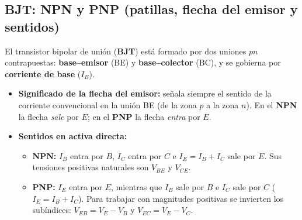 \documentclass[11pt,a4paper]{article}
\begin{document}
	\subsection{BJT: NPN y PNP (patillas, flecha del emisor y sentidos)}

	El transistor bipolar de unión (\textbf{BJT}) está formado por dos uniones $pn$ contrapuestas: \textbf{base--emisor} (BE) y \textbf{base--colector} (BC), y se gobierna por \textbf{corriente de base} ($I_B$).

	\begin{itemize}
		\item \textbf{Significado de la flecha del emisor:} señala siempre el sentido de la corriente convencional en la unión BE (de la zona $p$ a la zona $n$). En el \textbf{NPN} la flecha \emph{sale} por $E$; en el \textbf{PNP} la flecha \emph{entra} por $E$.
		\item \textbf{Sentidos en activa directa:}
		\begin{itemize}
			\item \textbf{NPN:} $I_B$ entra por $B$, $I_C$ entra por $C$ e $I_E = I_B + I_C$ sale por $E$. Sus tensiones positivas naturales son $V_{BE}$ y $V_{CE}$.
			\item \textbf{PNP:} $I_E$ entra por $E$, mientras que $I_B$ sale por $B$ e $I_C$ sale por $C$ ($I_E = I_B + I_C$). Para trabajar con magnitudes positivas se invierten los subíndices: $V_{EB} = V_E - V_B$ y $V_{EC} = V_E - V_C$.
		\end{itemize}
	\end{itemize}
\end{document}

